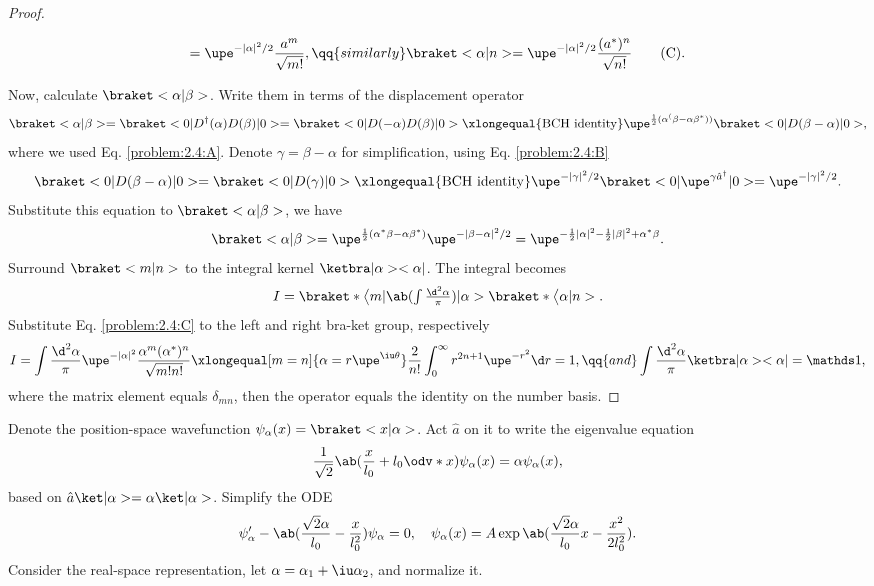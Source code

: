 \begin{solution}
\begin{enumext}
\begin{proof}
\begin{itemize}
\begin{equation}
      = \upe^{-|\alpha|^2/2} \frac{a^m}{\sqrt{m!}}, \qq{similarly}
      \braket<\alpha|n> = \upe^{-|\alpha|^2/2} \frac{(a^*)^n}{\sqrt{n!}}\tag{C}.
        \label{problem:2.4:C}
      \end{equation}
    \end{itemize}
    Now, calculate $\braket<\alpha|\beta>$. Write them in terms of the displacement operator
    \[
      \braket<\alpha|\beta> = \braket<0|D^\dagger(\alpha) D(\beta)|0>
    = \braket<0|D(-\alpha) D(\beta)|0>
    \xlongequal{\text{BCH identity}}
    \upe^{\frac12(\alpha^(\beta-\alpha\beta^*))} \braket<0|D(\beta - \alpha)|0>,
    \]
    where we used Eq. \eqref{problem:2.4:A}.
    Denote $\gamma = \beta - \alpha$ for simplification,
    using Eq. \eqref{problem:2.4:B}
    \[
      \braket<0|D(\beta - \alpha)|0> = \braket<0|D(\gamma)|0>
    \xlongequal{\text{BCH identity}} \upe^{-|\gamma|^2/2} \braket<0|\upe^{\gamma \hat a^\dagger}|0> = \upe^{-|\gamma|^2/2}.
    \]
    Substitute this equation to $\braket<\alpha|\beta>$, we have
    \[
      \braket<\alpha|\beta> = \upe^{\frac12(\alpha^*\beta-\alpha\beta^*)}
      \upe^{-|\beta-\alpha|^2/2}
    = \upe^{-\frac12|\alpha|^2-\frac12|\beta|^2+\alpha^*\beta}.
    \]
    Surround $\braket<m|n>$ to the integral kernel $\ketbra|\alpha><\alpha|$.
    The integral becomes
    \[
      \textstyle I = \braket*\big<m|\ab(\int\frac{\d^2\alpha}{\pi})|\alpha>\braket*\big<\alpha|n>.
    \]
    Substitute Eq. \eqref{problem:2.4:C} to the left and right bra-ket group, respectively
    \[
      I = \int \frac{\d^2\alpha}\pi \upe^{-|\alpha|^2} \frac{\alpha^m (\alpha^*)^n}{\sqrt{m!n!}}
      \xlongequal[m = n]{\alpha = r\upe^{\iu\theta}}
      \frac2{n!} \int_0^\infty r^{2n+1} \upe^{-r^2} \d r = 1, \qq{and}
      \int \frac{\d^2\alpha}{\pi} \ketbra|\alpha><\alpha| = \identity,
    \]
    where the matrix element equals $\delta_{mn}$, then the operator equals the identity on the number basis.
    \end{proof}
    \item Denote the position-space wavefunction $\psi_\alpha(x) = \braket<x|\alpha>$. Act $\hat a$ on it to write the eigenvalue equation
    \[
      \frac1{\sqrt2}\ab(\frac x{l_0} + l_0 \odv*{}x) \psi_\alpha(x) = \alpha \psi_\alpha(x),
    \]
    based on $\hat a\ket|\alpha> = \alpha\ket|\alpha>$. Simplify the ODE
    \[
      \psi_\alpha' - \ab(\frac{\sqrt2\alpha}{l_0} - \frac x{l_0^2})\psi_\alpha = 0,\quad
      \psi_\alpha(x) = A\exp\ab(\frac{\sqrt2\alpha}{l_0}x - \frac{x^2}{2l_0^2}).
    \]
    Consider the real-space representation, let $\alpha = \alpha_1 + \iu\alpha_2$, and normalize it.

\end{enumext}
\end{solution}
